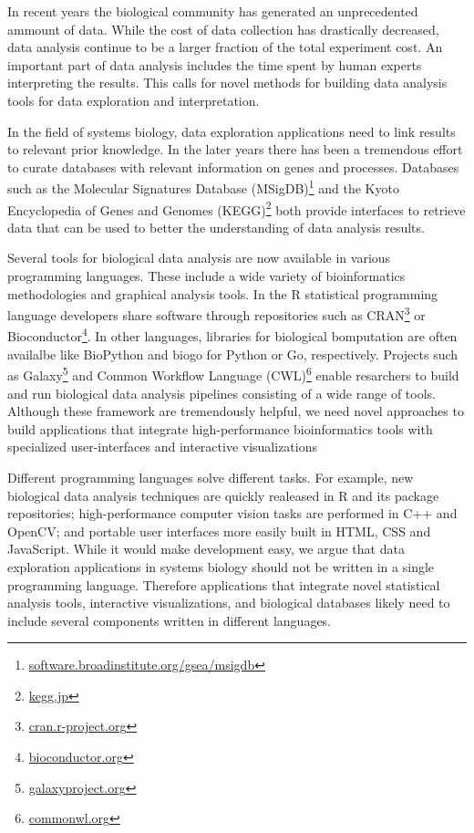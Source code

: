 In recent years the biological community has  generated  an
unprecedented ammount of data. While the cost of data collection has
drastically decreased, data analysis continue to be a larger fraction of the
total experiment cost.\cite{sboner2011real}  An important part of data analysis
includes the time spent by human experts interpreting the results. This calls
for novel methods for building data analysis tools for data exploration and
interpretation. 

In the field of systems biology, data exploration applications need to link
results to relevant prior knowledge. In the later years there has been a
tremendous effort to curate databases with relevant information on genes and
processes. Databases such as the Molecular Signatures Database
(MSigDB)\footnote{\url{software.broadinstitute.org/gsea/msigdb}} and the Kyoto
Encyclopedia of Genes and Genomes (KEGG)\footnote{\url{kegg.jp}} both provide
interfaces to retrieve data that can be used to better the understanding of
data analysis results. 

Several tools for biological data analysis are now available in various
programming languages. These include a wide variety of bioinformatics
methodologies and graphical analysis tools.
In the R statistical programming language developers share software through
repositories such as CRAN\footnote{\url{cran.r-project.org}} or
Bioconductor\footnote{\url{bioconductor.org}}.  In other languages, libraries
for biological bomputation are often availalbe like BioPython\cite{biopython}
and biogo\cite{biogo} for Python or Go, respectively. Projects such as
Galaxy\footnote{\url{galaxyproject.org}} and Common Workflow Language
(CWL)\footnote{\url{commonwl.org}} enable resarchers to build and run
biological data analysis pipelines consisting of a wide range of tools.
Although these framework are tremendously helpful, we need novel approaches to
build applications that integrate high-performance bioinformatics tools with 
specialized user-interfaces and interactive visualizations

Different programming languages solve different tasks.  For example, new
biological data analysis techniques are quickly realeased in R and its package
repositories; high-performance computer vision tasks are performed in C++ and
OpenCV; and portable user interfaces more easily built in HTML, CSS and
JavaScript.  While it would make development easy, we argue that data
exploration applications in systems biology should not be written in a single
programming language. Therefore applications that integrate novel statistical
analysis tools, interactive visualizations, and biological databases likely
need to include several components written in different languages. 

